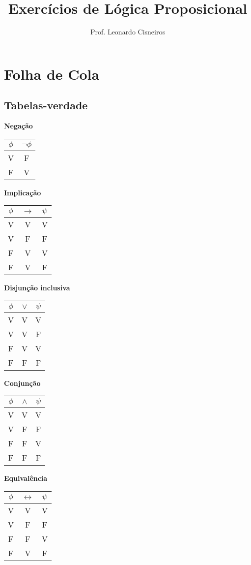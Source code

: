 \documentclass[a4paper,10pt]{article}
\title{\fontfamily{phv}\fontsize{28}{28}\fontseries{b}\selectfont%
Exercícios de Lógica Proposicional}
\author{Prof. Leonardo Cisneiros}
\begin{document}
\maketitle

\section{Folha de Cola}



\subsection{Tabelas-verdade}

\begin{multicols}{2}

\textbf{Negação}\\
\begin{tabular}{c|c}
 $\phi$ & $\neg\phi$ \\
 \hline
 V	&	F \\
 F	&	V \\
\end{tabular}


\textbf{Implicação}\\
\begin{tabular}{c|c|c}
$\phi$ & $\rightarrow$ & $\psi$ \\
 \hline
 V	&	V	&	V  \\
 V	&	F	&	F \\
 F	&	V	&	V \\
 F	&	V	&	F
\end{tabular}



\textbf{Disjunção inclusiva}\\
\begin{tabular}{c|c|c}
$\phi$ & $\vee$ & $\psi$ \\
 \hline
 V	&	V	&	V  \\
 V	&	V	&	F \\
 F	&	V	&	V \\
 F	&	F	&	F
\end{tabular}

\textbf{Conjunção}\\
\begin{tabular}{c|c|c}
$\phi$ & $\wedge$ & $\psi$ \\
 \hline
 V	&	V	&	V  \\
 V	&	F	&	F \\
 F	&	F	&	V \\
 F	&	F	&	F
\end{tabular}

\textbf{Equivalência}\\
\begin{tabular}{c|c|c}
$\phi$ & $\leftrightarrow$ & $\psi$ \\
 \hline
 V	&	V	&	V  \\
 V	&	F	&	F \\
 F	&	F	&	V \\
 F	&	V	&	F
\end{tabular}

\end{multicols}
\end{document}

